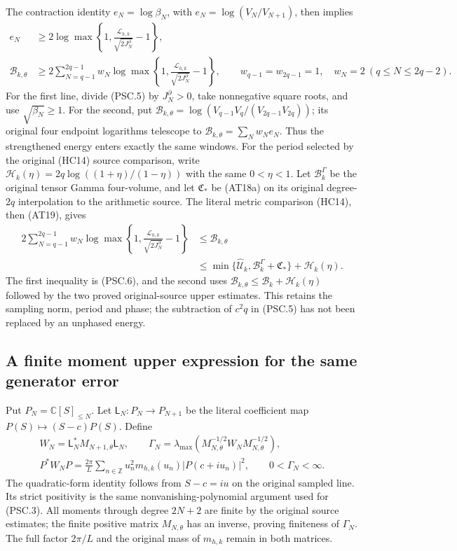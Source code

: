 The contraction identity \(e_N=\log\beta_N\), with
\(e_N=\log(V_N/V_{N+1})\), then implies
\[
 \begin{split}
 e_N&\ge
 2\log\max\left\{1,
       \frac{\mathcal L_{h,k}}{\sqrt{2J_N^\partial}}-1\right\},
 \\
 \mathcal B_{k,\theta}
 &\ge2\sum_{N=q-1}^{2q-1}w_N
 \log\max\left\{1,
       \frac{\mathcal L_{h,k}}{\sqrt{2J_N^\partial}}-1\right\},
 \qquad
 w_{q-1}=w_{2q-1}=1,\quad w_N=2\ (q\le N\le2q-2).
 \end{split}
 \tag{PSC.6}\label{eq:psc-endpoints}
\]
For the first line, divide (PSC.5) by \(J_N^\partial>0\),
take nonnegative square roots, and use \(\sqrt{\beta_N}\ge1\).
For the second, put
\(\mathcal B_{k,\theta}
=\log(V_{q-1}V_q/(V_{2q-1}V_{2q}))\);
its original four endpoint logarithms telescope
to \(\mathcal B_{k,\theta}=\sum_Nw_Ne_N\).
Thus the strengthened energy enters exactly the same windows.
For the period selected by the original (HC14) source comparison,
write $\mathcal H_k(\eta)=2q\log((1+\eta)/(1-\eta))$ with
the same $0<\eta<1$. Let $\mathcal B_k^\Gamma$ be the original
tensor Gamma four-volume, and let $\mathfrak C_*$ be (AT18a)
on its original degree-$2q$ interpolation to the arithmetic source.
The literal metric comparison (HC14), then (AT19), gives
\[
\begin{aligned}
2\sum_{N=q-1}^{2q-1}w_N
 \log\max\left\{1,
       \frac{\mathcal L_{h,k}}{\sqrt{2J_N^\partial}}-1\right\}
&\le\mathcal B_{k,\theta}\\
&\le\min\{\widehat{\mathcal U}_k,
            \mathcal B_k^\Gamma+\mathfrak C_*\}+\mathcal H_k(\eta).
\end{aligned}\tag{PSC.6a}
\]
The first inequality is (PSC.6), and the second uses
$\mathcal B_{k,\theta}\le\mathcal B_k+\mathcal H_k(\eta)$
followed by the two proved original-source upper estimates.
This retains the sampling norm, period and phase; the subtraction
of $c^2q$ in (PSC.5) has not been replaced by an unphased energy.

\subsection{A finite moment upper expression for the same generator error}
\label{sec:psc-moments}

Put \(P_N=\mathbb C[S]_{\le N}\). Let
\(\mathsf L_N:P_N\to P_{N+1}\) be the literal coefficient map
\(P(S)\mapsto(S-c)P(S)\). Define
\[
 \begin{gathered}
 W_N=\mathsf L_N^*M_{N+1,\theta}\mathsf L_N,\qquad
 \Gamma_N=
 \lambda_{\max}(M_{N,\theta}^{-1/2}W_NM_{N,\theta}^{-1/2}),\\
 P^*W_NP=
 \frac{2\pi}{L}\sum_{n\in\mathbb Z}
 u_n^2m_{h,k}(u_n)|P(c+iu_n)|^2,\qquad
 0<\Gamma_N<\infty .
 \end{gathered}
 \tag{PSC.7}\label{eq:psc-moment}
\]
The quadratic-form identity follows from \(S-c=iu\) on the
original sampled line. Its strict positivity is the same
nonvanishing-polynomial argument used for (PSC.3).
All moments through degree \(2N+2\) are finite by the original
source estimates; the finite positive matrix \(M_{N,\theta}\)
has an inverse, proving finiteness of \(\Gamma_N\).
The full factor \(2\pi/L\) and the original mass of \(m_{h,k}\)
remain in both matrices.

